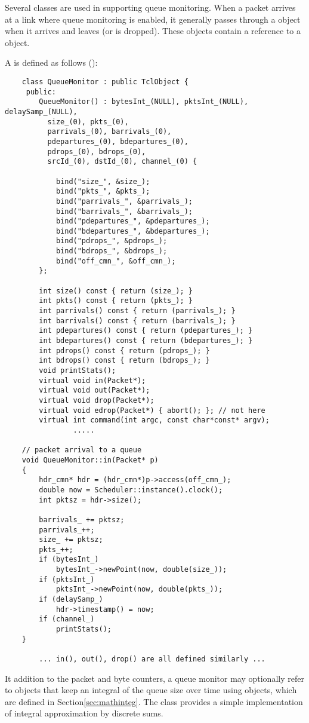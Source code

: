 Several classes are used in supporting queue monitoring.
When a packet arrives at a link where queue monitoring is enabled,
it generally passes through a  object when it
arrives and leaves (or is dropped).
These objects contain a reference to a  object.

A  is defined as follows ():
\begin{small}
\begin{verbatim}
	class QueueMonitor : public TclObject {
	 public: 
		QueueMonitor() : bytesInt_(NULL), pktsInt_(NULL), delaySamp_(NULL),
		  size_(0), pkts_(0),
		  parrivals_(0), barrivals_(0),
		  pdepartures_(0), bdepartures_(0),
		  pdrops_(0), bdrops_(0),
		  srcId_(0), dstId_(0), channel_(0) {

			bind("size_", &size_);
			bind("pkts_", &pkts_);
			bind("parrivals_", &parrivals_);
			bind("barrivals_", &barrivals_);
			bind("pdepartures_", &pdepartures_);
			bind("bdepartures_", &bdepartures_);
			bind("pdrops_", &pdrops_);
			bind("bdrops_", &bdrops_);
			bind("off_cmn_", &off_cmn_);
		};

		int size() const { return (size_); }
		int pkts() const { return (pkts_); }
		int parrivals() const { return (parrivals_); }
		int barrivals() const { return (barrivals_); }
		int pdepartures() const { return (pdepartures_); }
		int bdepartures() const { return (bdepartures_); }
		int pdrops() const { return (pdrops_); }
		int bdrops() const { return (bdrops_); }
		void printStats();
		virtual void in(Packet*);
		virtual void out(Packet*);
		virtual void drop(Packet*);
		virtual void edrop(Packet*) { abort(); }; // not here
		virtual int command(int argc, const char*const* argv);
                .....

	// packet arrival to a queue
	void QueueMonitor::in(Packet* p)
	{
		hdr_cmn* hdr = (hdr_cmn*)p->access(off_cmn_);
		double now = Scheduler::instance().clock();
		int pktsz = hdr->size();

		barrivals_ += pktsz;
		parrivals_++;
		size_ += pktsz;
		pkts_++;
		if (bytesInt_)
			bytesInt_->newPoint(now, double(size_));
		if (pktsInt_)
			pktsInt_->newPoint(now, double(pkts_));
		if (delaySamp_)
			hdr->timestamp() = now;
		if (channel_)
			printStats();
	}

        ... in(), out(), drop() are all defined similarly ...
\end{verbatim}
\end{small}
It addition to the packet and byte counters, a queue monitor
may optionally refer to objects that keep an integral
of the queue size over time using
 objects, which are defined in Section\ref{sec:mathinteg}.
The  class provides a simple implementation of
integral approximation by discrete sums.

